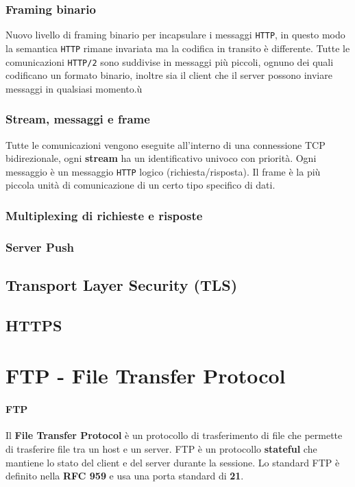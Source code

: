         \subsubsection{Framing binario}
            Nuovo livello di framing binario per incapsulare i messaggi \texttt{HTTP}, in questo modo la semantica \texttt{HTTP} rimane invariata ma la codifica in transito è differente. Tutte le comunicazioni \texttt{HTTP/2} sono suddivise in messaggi più piccoli, ognuno dei quali codificano un formato binario, inoltre sia il client che il server possono inviare messaggi in qualsiasi momento.ù
        \subsubsection{Stream, messaggi e frame}
            Tutte le comunicazioni vengono eseguite all'interno di una connessione TCP bidirezionale, ogni \textbf{stream} ha un identificativo univoco con priorità. Ogni messaggio è un messaggio \texttt{HTTP} logico (richiesta/risposta). Il frame è la più piccola unità di comunicazione di un certo tipo specifico di dati.
        \subsubsection{Multiplexing di richieste e risposte}
        \subsubsection{Server Push}
    \subsection{Transport Layer Security (TLS)}
    \subsection{HTTPS}
\section{FTP - File Transfer Protocol}
    \paragraph{FTP} Il \textbf{File Transfer Protocol} è un protocollo di trasferimento di file che permette di trasferire file tra un host e un server. FTP è un protocollo \textbf{stateful} che mantiene lo stato del client e del server durante la sessione. Lo standard FTP è definito nella \textbf{RFC 959} e usa una porta standard di \textbf{21}.
